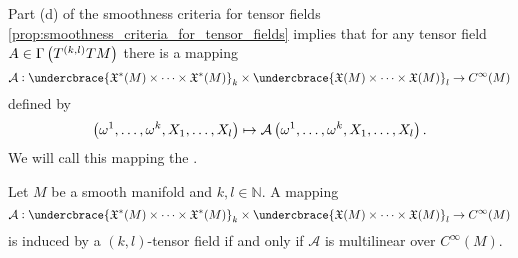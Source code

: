 Part (d) of the smoothness criteria for tensor fields \ref{prop:smoothness_criteria_for_tensor_fields} implies that for any tensor field $A \in \Gamma\del[1]{T^{(k,l)}TM}$ there is a mapping 
\begin{equation*}
	\mathcal{A} : \undercbrace{\mathfrak{X}^*(M) \times \dots \times \mathfrak{X}^*(M)}_{k} \times \undercbrace{\mathfrak{X}(M) \times \dots \times \mathfrak{X}(M)}_{l} \to C^\infty(M)
\end{equation*}
\noindent defined by 
\begin{equation*}
	\del[1]{\omega^1,\dots,\omega^k,X_1,\dots,X_l} \mapsto \mathcal{A}\del[1]{\omega^1,\dots,\omega^k,X_1,\dots,X_l}.
\end{equation*}
We will call this mapping the .

\begin{theorem}
	\label{thm:tensor_field_characterisation_lemma}
	Let $M$ be a smooth manifold and $k,l \in \mathbb{N}$. A mapping
\begin{equation*}
	\mathcal{A}: \undercbrace{\mathfrak{X}^*(M) \times \dots \times \mathfrak{X}^*(M)}_{k} \times \undercbrace{\mathfrak{X}(M) \times \dots \times \mathfrak{X}(M)}_{l} \to C^\infty(M) 
	\end{equation*}
	\noindent is induced by a $(k,l)$-tensor field if and only if $\mathcal{A}$ is multilinear over $C^\infty(M)$.
\end{theorem}

